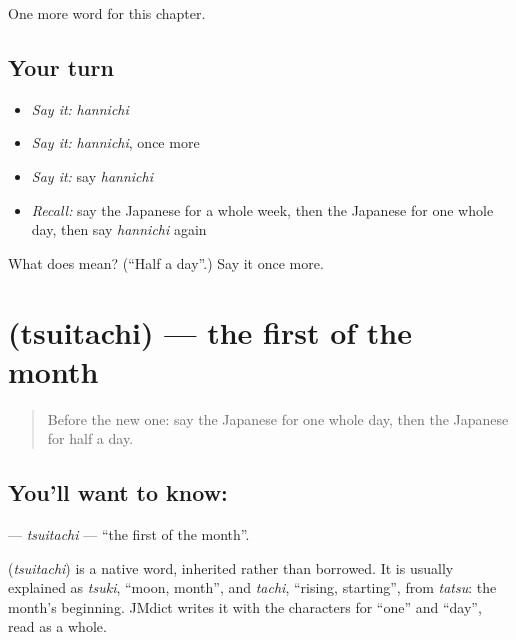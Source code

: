 \begin{grammarlens}[title={What you've built}]
One more word for this chapter.
\end{grammarlens}

\subsection*{Your turn}
\begin{itemize}
\raggedright
  \item \emph{Say it:} \emph{hannichi}
  \item \emph{Say it:} \emph{hannichi}, once more
  \item \emph{Say it:} say \emph{hannichi}
  \item \emph{Recall:} say the Japanese for a whole week, then the Japanese for one whole day, then say \emph{hannichi} again
\end{itemize}

\begin{tcolorbox}[breakable,colback=teal!4,colframe=teal!35!black,title={Before you move on}]
What does  mean? (\textquotedblleft{}Half a day\textquotedblright{}.) Say it once more.
\end{tcolorbox}
\section[\texorpdfstring{\ja{ついたち} (tsuitachi)}{ついたち (tsuitachi)}]{ (tsuitachi) — the first of the month}

\label{lesson:JA-C76-tsuitachi}



\begin{quote}
Before the new one: say the Japanese for one whole day, then the Japanese for half a day.
\end{quote}

\subsection*{You'll want to know: }
\textbf{} — \emph{tsuitachi} — \textquotedblleft{}the first of the month\textquotedblright{}.

\begin{cousinweb}
\textbf{} (\emph{tsuitachi}) is a native word, inherited rather than borrowed. It is usually explained as \emph{tsuki}, \textquotedblleft{}moon, month\textquotedblright{}, and \emph{tachi}, \textquotedblleft{}rising, starting\textquotedblright{}, from \emph{tatsu}: the month's beginning. JMdict writes it with the characters for \textquotedblleft{}one\textquotedblright{} and \textquotedblleft{}day\textquotedblright{}, read as a whole.
\end{cousinweb}


